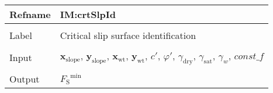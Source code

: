\documentclass[12pt]{article}
\begin{document}
\vspace{\baselineskip}
\noindent
\begin{minipage}{\textwidth}
\begin{tabular}{>{\raggedright}p{}>{\raggedright\arraybackslash}p{}}
\toprule \textbf{Refname} & \textbf{IM:crtSlpId}
\label{IM:crtSlpId}
\\ \midrule \\
Label & Critical slip surface identification
        
\\ \midrule \\
Input & ${\symbf{x}_{\text{slope}}}$, ${\symbf{y}_{\text{slope}}}$, ${\symbf{x}_{\text{wt}}}$, ${\symbf{y}_{\text{wt}}}$, $c'$, $φ'$, ${γ_{\text{dry}}}$, ${γ_{\text{sat}}}$, ${γ_{w}}$, $\mathit{const\_f}$
        
\\ \midrule \\
Output & ${{F_{\text{S}}}^{\text{min}}}$
         

\end{tabular}
\end{minipage}
\end{document}
